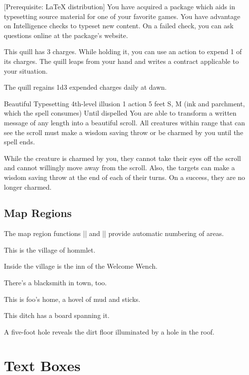 \documentclass[letterpaper,twocolumn,openany,nodeprecatedcode]{dndbook}
\begin{document}
[Prerequisite: \LaTeX{} distribution]
You have acquired a package which aids in typesetting source material for one of your favorite games. You have advantage on Intelligence checks to typeset new content. On a failed check, you can ask questions online at the package's website.

This quill has 3 charges. While holding it, you can use an action to expend 1 of its charges. The quill leaps from your hand and writes a contract applicable to your situation.

The quill regains 1d3 expended charges daily at dawn.

\DndSpellHeader%
  {Beautiful Typesetting}
  {4th-level illusion}
  {1 action}
  {5 feet}
  {S, M (ink and parchment, which the spell consumes)}
  {Until dispelled}
You are able to transform a written message of any length into a beautiful scroll. All creatures within range that can see the scroll must make a wisdom saving throw or be charmed by you until the spell ends.

While the creature is charmed by you, they cannot take their eyes off the scroll and cannot willingly move away from the scroll. Also, the targets can make a wisdom saving throw at the end of each of their turns. On a success, they are no longer charmed.

\section{Map Regions}
The map region functions |\DndArea| and |\DndSubArea| provide automatic numbering of areas.

This is the village of hommlet.

Inside the village is the inn of the Welcome Wench.

There's a blacksmith in town, too.

This is foo's home, a hovel of mud and sticks.

This ditch has a board spanning it.

A five-foot hole reveals the dirt floor illuminated by a hole in the roof.






\chapter{Text Boxes}
\end{document}
